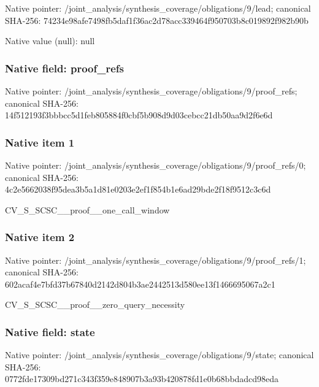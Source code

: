\documentclass[10pt,a4paper]{article}
\begin{document}
Native pointer: /joint\_analysis/synthesi\allowbreak{}s\_coverage/obligations/9\allowbreak{}/lead; canonical SHA-256: 74234e98afe7498fb5daf1f3\allowbreak{}6ac2d78acc339464f950703b\allowbreak{}8c019892f982b90b



Native value (null): null



\subsubsection{Native field: proof\_refs}


Native pointer: /joint\_analysis/synthesi\allowbreak{}s\_coverage/obligations/9\allowbreak{}/proof\_refs; canonical SHA-256: 14f512193f3bbbcc5d1feb80\allowbreak{}5884f0cbf5b908d9d03cebcc\allowbreak{}21db50aa9d2f6e6d



\subsubsection{Native item 1}


Native pointer: /joint\_analysis/synthesi\allowbreak{}s\_coverage/obligations/9\allowbreak{}/proof\_refs/0; canonical SHA-256: 4c2e5662038f95dea3b5a1d8\allowbreak{}1e0203e2ef1f854b1e6ad29b\allowbreak{}de2f18f9512c3c6d


CV\_S\_SCSC\_\_proof\_\_one\_call\_window


\subsubsection{Native item 2}


Native pointer: /joint\_analysis/synthesi\allowbreak{}s\_coverage/obligations/9\allowbreak{}/proof\_refs/1; canonical SHA-256: 602acaf4e7bfd37b67840d21\allowbreak{}42d804b3ae2442513d580ee1\allowbreak{}3f1466695067a2c1


CV\_S\_SCSC\_\_proof\_\_zero\_query\_necessity


\subsubsection{Native field: state}


Native pointer: /joint\_analysis/synthesi\allowbreak{}s\_coverage/obligations/9\allowbreak{}/state; canonical SHA-256: 0772fde17309bd271c343f35\allowbreak{}9e848907b3a93b420878fd1e\allowbreak{}0b68bbdadcd98eda
\end{document}
